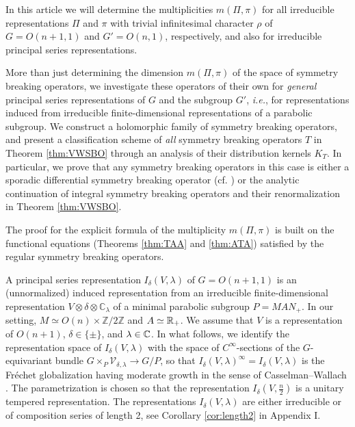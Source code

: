In this article we will determine
 the multiplicities $m(\Pi,\pi)$ for all irreducible representations
 $\Pi$ and $\pi$
 with trivial infinitesimal character $\rho$ of $G=O(n+1,1)$ and $G'=O(n,1)$, 
 respectively, 
 and also for irreducible principal series representations.  



More than just determining the dimension $m(\Pi,\pi)$
 of the space of symmetry breaking operators, 
 we investigate these operators of their own 
 for {\it{general}} principal series representations of $G$ and the subgroup $G'$, 
{\it{i.e.}}, 
 for representations induced from irreducible finite-dimensional representations of a parabolic subgroup.  
We construct a holomorphic family
 of symmetry breaking operators, 
 and present a 
 classification scheme of {\it{all}} symmetry breaking operators $T$
 in Theorem \ref{thm:VWSBO}
 through an analysis of their distribution kernels $K_T$.  
In particular, 
 we prove that any symmetry breaking operators
 in this case is either a 
 sporadic differential symmetry breaking operator
 (cf. \cite{KKP})
 or the analytic continuation
 of integral symmetry breaking operators
 and their renormalization
 in Theorem \ref{thm:VWSBO}.  



The proof for the explicit formula
 of the multiplicity $m(\Pi, \pi)$ is built on 
 the 
 functional equations 
 (Theorems \ref{thm:TAA} and \ref{thm:ATA})
 satisfied by the regular symmetry breaking operators.  


\vskip 2pc
A principal series representation
 $I_\delta(V,\lambda)$ of $G=O(n+1,1)$
 is an (unnormalized) induced representation from an irreducible
 finite-dimensional representation
 $V\otimes \delta \otimes {\mathbb{C}}_\lambda$
 of a minimal parabolic subgroup $P=MAN_+$. 
In our setting, 
 $M \simeq O(n) \times  {\mathbb{Z}}/2{\mathbb{Z}}$ and $A \simeq {\mathbb R}_+$. 
We assume that $V$ is a representation of $O(n+1)$, 
 $\delta \in \{\pm\}$,
 and $\lambda \in {\mathbb C}$.
In what follows,
 we identify the representation space
 of $I_\delta(V, \lambda)$ 
 with the space
 of $C^{\infty}$-sections
 of the $G$-equivariant  bundle 
 $G \times_P {\mathcal V}_{\delta,\lambda} \to G/P$, 
so that 
 $I_\delta(V, \lambda)^{\infty} = I_\delta (V,\lambda)$
 is the Fr{\'e}chet globalization
 having moderate growth
 in the sense 
 of Casselman--Wallach \cite{W}.  
The parametrization is chosen
 so that the representation $ I_\delta (V,\frac n2)$ is a unitary tempered representation. 
The representations $I_\delta(V,\lambda)$ are either irreducible
 or of composition series of length 2, 
 see Corollary \ref{cor:length2} in Appendix I.



